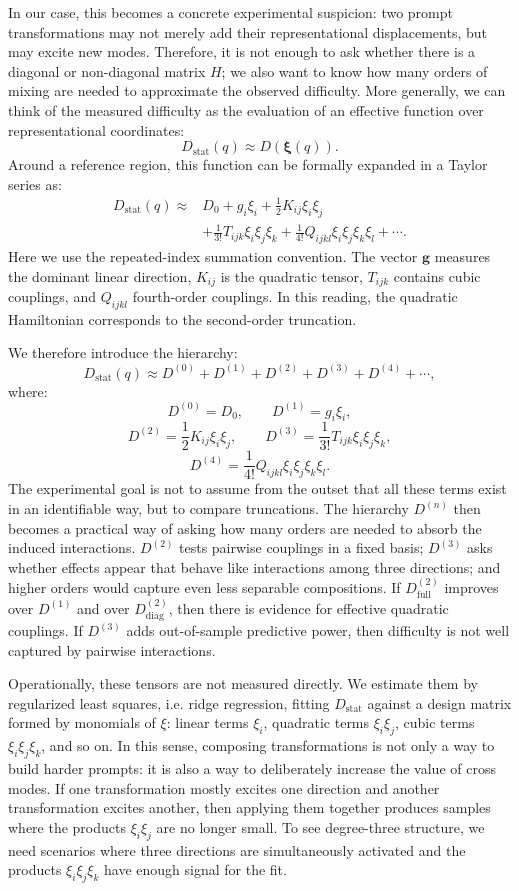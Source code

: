 \documentclass[10pt,twocolumn]{article}
\newcommand{\Dstat}{D_{\mathrm{stat}}}
\newcommand{\xrep}{\bm{\xi}}
\begin{document}
In our case, this becomes a concrete experimental suspicion: two prompt transformations may not merely add their representational displacements, but may excite new modes. Therefore, it is not enough to ask whether there is a diagonal or non-diagonal matrix \(H\); we also want to know how many orders of mixing are needed to approximate the observed difficulty. More generally, we can think of the measured difficulty as the evaluation of an effective function over representational coordinates:
\[
D_{\mathrm{stat}}(q)
\approx
D(\xrep(q)).
\]
Around a reference region, this function can be formally expanded in a Taylor series as:
\[
\begin{aligned}
D_{\mathrm{stat}}(q)
\approx{}&
D_0
+g_i\xi_i
+\frac{1}{2}K_{ij}\xi_i\xi_j\\
&+\frac{1}{3!}T_{ijk}\xi_i\xi_j\xi_k
+\frac{1}{4!}Q_{ijkl}\xi_i\xi_j\xi_k\xi_l
+\cdots .
\end{aligned}
\]
Here we use the repeated-index summation convention. The vector \(\bm{g}\) measures the dominant linear direction, \(K_{ij}\) is the quadratic tensor, \(T_{ijk}\) contains cubic couplings, and \(Q_{ijkl}\) fourth-order couplings. In this reading, the quadratic Hamiltonian corresponds to the second-order truncation.

We therefore introduce the hierarchy:
\[
D_{\mathrm{stat}}(q)
\approx
D^{(0)}+D^{(1)}+D^{(2)}+D^{(3)}+D^{(4)}+\cdots,
\]
where:
\[
D^{(0)}=D_0,
\qquad
D^{(1)}=g_i\xi_i,
\]
\[
D^{(2)}=\frac{1}{2}K_{ij}\xi_i\xi_j,
\qquad
D^{(3)}=\frac{1}{3!}T_{ijk}\xi_i\xi_j\xi_k,
\]
\[
D^{(4)}=\frac{1}{4!}Q_{ijkl}\xi_i\xi_j\xi_k\xi_l.
\]
The experimental goal is not to assume from the outset that all these terms exist in an identifiable way, but to compare truncations. The hierarchy \(D^{(n)}\) then becomes a practical way of asking how many orders are needed to absorb the induced interactions. \(D^{(2)}\) tests pairwise couplings in a fixed basis; \(D^{(3)}\) asks whether effects appear that behave like interactions among three directions; and higher orders would capture even less separable compositions. If \(D^{(2)}_{\mathrm{full}}\) improves over \(D^{(1)}\) and over \(D^{(2)}_{\mathrm{diag}}\), then there is evidence for effective quadratic couplings. If \(D^{(3)}\) adds out-of-sample predictive power, then difficulty is not well captured by pairwise interactions.

Operationally, these tensors are not measured directly. We estimate them by regularized least squares, i.e. ridge regression, fitting \(\Dstat\) against a design matrix formed by monomials of \(\xi\): linear terms \(\xi_i\), quadratic terms \(\xi_i\xi_j\), cubic terms \(\xi_i\xi_j\xi_k\), and so on. In this sense, composing transformations is not only a way to build harder prompts: it is also a way to deliberately increase the value of cross modes. If one transformation mostly excites one direction and another transformation excites another, then applying them together produces samples where the products \(\xi_i\xi_j\) are no longer small. To see degree-three structure, we need scenarios where three directions are simultaneously activated and the products \(\xi_i\xi_j\xi_k\) have enough signal for the fit.
\end{document}
